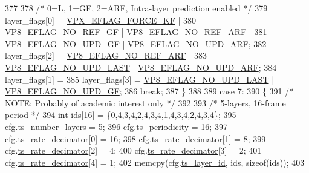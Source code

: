 \begin{DoxyCodeInclude}
{{{{{{{{{{{{{{{377 
378         \textcolor{comment}{/* 0=L, 1=GF, 2=ARF, Intra-layer prediction enabled */}
379         layer\_flags[0] = \hyperlink{group__encoder_ga4c4f4e3cbb5225d2c6c050e2d1e948fa}{VPX\_EFLAG\_FORCE\_KF}  |
380                          \hyperlink{group__vp8__encoder_gabb5e95343a2738abef44eca13059da33}{VP8\_EFLAG\_NO\_REF\_GF} | 
      \hyperlink{group__vp8__encoder_ga650ab0baea12be91082226a5cc18776a}{VP8\_EFLAG\_NO\_REF\_ARF} |
381                          \hyperlink{group__vp8__encoder_gab01d066c5236457d345ce1cab4c41d6b}{VP8\_EFLAG\_NO\_UPD\_GF} | 
      \hyperlink{group__vp8__encoder_ga1cff46a5287e73a620660030d40b9e6c}{VP8\_EFLAG\_NO\_UPD\_ARF};
382         layer\_flags[2] = \hyperlink{group__vp8__encoder_ga650ab0baea12be91082226a5cc18776a}{VP8\_EFLAG\_NO\_REF\_ARF} |
383                          \hyperlink{group__vp8__encoder_ga602edb6b02a89cb2db7a16d6dffba583}{VP8\_EFLAG\_NO\_UPD\_LAST} | 
      \hyperlink{group__vp8__encoder_ga1cff46a5287e73a620660030d40b9e6c}{VP8\_EFLAG\_NO\_UPD\_ARF};
384         layer\_flags[1] =
385         layer\_flags[3] = \hyperlink{group__vp8__encoder_ga602edb6b02a89cb2db7a16d6dffba583}{VP8\_EFLAG\_NO\_UPD\_LAST} | 
      \hyperlink{group__vp8__encoder_gab01d066c5236457d345ce1cab4c41d6b}{VP8\_EFLAG\_NO\_UPD\_GF};
386         \textcolor{keywordflow}{break};
387     \}
388 
389     \textcolor{keywordflow}{case} 7:
390     \{
391         \textcolor{comment}{/* NOTE: Probably of academic interest only */}
392 
393         \textcolor{comment}{/* 5-layers, 16-frame period */}
394         \textcolor{keywordtype}{int} ids[16] = \{0,4,3,4,2,4,3,4,1,4,3,4,2,4,3,4\};
395         cfg.\hyperlink{structvpx__codec__enc__cfg_a16d4549a30cbd585e3c3056ef873d8c7}{ts\_number\_layers}     = 5;
396         cfg.\hyperlink{structvpx__codec__enc__cfg_a4ec338780115dd270acf0dac24193474}{ts\_periodicity}       = 16;
397         cfg.\hyperlink{structvpx__codec__enc__cfg_ad40c30846ef8ef1d8684f10a491ec535}{ts\_rate\_decimator}[0] = 16;
398         cfg.\hyperlink{structvpx__codec__enc__cfg_ad40c30846ef8ef1d8684f10a491ec535}{ts\_rate\_decimator}[1] = 8;
399         cfg.\hyperlink{structvpx__codec__enc__cfg_ad40c30846ef8ef1d8684f10a491ec535}{ts\_rate\_decimator}[2] = 4;
400         cfg.\hyperlink{structvpx__codec__enc__cfg_ad40c30846ef8ef1d8684f10a491ec535}{ts\_rate\_decimator}[3] = 2;
401         cfg.\hyperlink{structvpx__codec__enc__cfg_ad40c30846ef8ef1d8684f10a491ec535}{ts\_rate\_decimator}[4] = 1;
402         memcpy(cfg.\hyperlink{structvpx__codec__enc__cfg_a4d105d2470dbfb7210b33d298f1cf1f6}{ts\_layer\_id}, ids, \textcolor{keyword}{sizeof}(ids));
403 
}}}}}}}}}}}}}}}
\end{DoxyCodeInclude}
